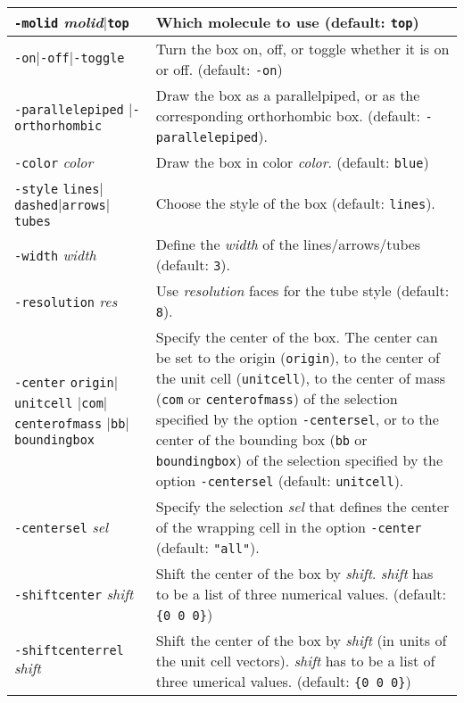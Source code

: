 \documentclass[a4paper, DIV12]{scrartcl}
\begin{document}
\begin{tabular}{|p{}|p{}|}
\hline

\texttt{-molid} \textit{molid}$|$\texttt{top}
& Which molecule to use (default: \texttt{top})
\\ \hline

\texttt{-on}$|$\texttt{-off}$|$\texttt{-toggle}
& Turn the box on, off, or toggle whether it is on or off. (default:
\texttt{-on})
\\ \hline

\texttt{-parallelepiped} $|$\texttt{-orthorhombic}
& Draw the box as a parallelpiped, or as the corresponding
orthorhombic box. (default: \texttt{-parallelepiped}).
\\ \hline

\texttt{-color} \textit{color}
& Draw the box in color \textit{color}. (default: \texttt{blue})
\\ \hline


\texttt{-style}
\texttt{lines}$|$\texttt{dashed}$|$\texttt{arrows}$|$\texttt{tubes}
& Choose the style of the box (default: \texttt{lines}).
\\ \hline

\texttt{-width} \textit{width}
& Define the \textit{width} of the lines/arrows/tubes (default:
\texttt{3}). 
\\ \hline

\texttt{-resolution} \textit{res}
& Use \textit{resolution} faces for the tube style (default:
\texttt{8}).
\\ \hline

\texttt{-center} \texttt{origin}$|$\texttt{unitcell}\linebreak
\hspace*{1em}$|$\texttt{com}$|$\texttt{centerofmass}\linebreak 
\hspace*{1em}$|$\texttt{bb}$|$\texttt{boundingbox}
& Specify the center of the box. The center can be set to
the origin (\texttt{origin}), to the center of the unit cell
(\texttt{unitcell}), to the center of mass (\texttt{com} or
\texttt{centerofmass}) of the selection specified by the option
\texttt{-centersel}, or to the center of the bounding box (\texttt{bb}
or \texttt{boundingbox}) of the selection specified by the option
\texttt{-centersel} (default: \texttt{unitcell}).
\\ \hline

\texttt{-centersel} \textit{sel}
& Specify the selection \textit{sel} that defines the center of the
wrapping cell in the option \texttt{-center} (default:
\texttt{"all"}).
\\ \hline

\texttt{-shiftcenter} \textit{shift}
& Shift the center of the box by \textit{shift}. \textit{shift} has to
be a list of three numerical values. (default: \verb!{0 0 0}!)
\\ \hline

\texttt{-shiftcenterrel} \textit{shift}
& Shift the center of the box by \textit{shift} (in units of
the unit cell vectors). \textit{shift} has to be a list of
three umerical values. (default: \verb!{0 0 0}!)
\\ \hline
\end{tabular}
\end{document}
